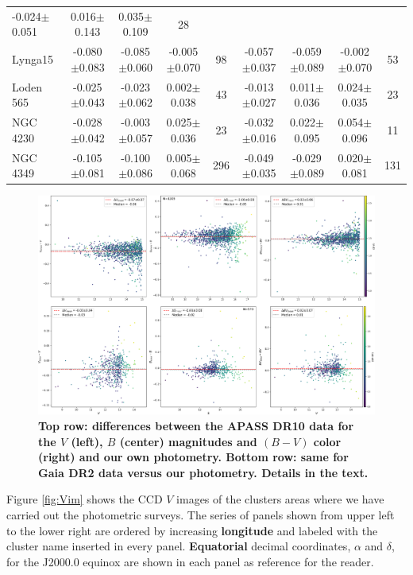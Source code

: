 \documentclass[referee]{aa}
\begin{document}
\begin{table}[ht]
\begin{tabular}{lcccc|cccc}
-0.024$\pm$0.051 & 0.016$\pm$0.143 & 0.035$\pm$0.109 & 28\\
Lynga15   & -0.080$\pm$0.083 & -0.085$\pm$0.060 & -0.005$\pm$0.070 & 98 &
-0.057$\pm$0.037 & -0.059$\pm$0.089 & -0.002$\pm$0.070 & 53\\
Loden 565 & -0.025$\pm$0.043 & -0.023$\pm$0.062 & 0.002$\pm$0.038 & 43 &
-0.013$\pm$0.027 & 0.011$\pm$0.036 & 0.024$\pm$0.035 & 23\\
NGC 4230  & -0.028$\pm$0.042 & -0.003$\pm$0.057 & 0.025$\pm$0.036 & 23 &
-0.032$\pm$0.016 & 0.022$\pm$0.095 & 0.054$\pm$0.096 & 11\\
NGC 4349  & -0.105$\pm$0.081 & -0.100$\pm$0.086 & 0.005$\pm$0.068 & 296 &
-0.049$\pm$0.035 & -0.029$\pm$0.089 & 0.020$\pm$0.081 & 131\\
    \hline
    \end{tabular}
    \label{tab:phot_diffs}
\end{table}

\begin{figure}[ht]
    \centering
     \includegraphics[width=\hsize]{../figs/apass_gaia_V_B_BV.png}   
\caption{\textbf{Top row: differences between the APASS DR10 data for the $V$
(left), $B$ (center) magnitudes and $(B-V)$ color (right) and our own
photometry. Bottom row: same for Gaia DR2 data versus our photometry. Details
in the text.}}
    \label{fig:gaia_transf}
\end{figure}

Figure \ref{fig:Vim} shows the CCD $V$ images of the clusters areas where we
have carried out the photometric surveys. The series of panels shown from upper
left to the lower right are ordered by increasing \textbf{longitude} and labeled
with the cluster name inserted in every panel. \textbf{Equatorial} decimal
coordinates, $\alpha$ and $\delta$, for the J2000.0 equinox are shown in each
panel as reference for the reader.\\
\end{document}
